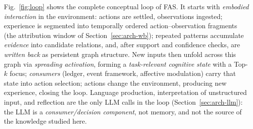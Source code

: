 \documentclass[10pt,a4paper]{article}
\begin{document}
Fig.~\ref{fig:loop} shows the complete conceptual loop of FAS. It starts with \emph{embodied interaction} in the environment: actions are settled, observations ingested; experience is segmented into temporally ordered action--observation fragments (the attribution window of Section~\ref{sec:arch-wb}); repeated patterns accumulate \emph{evidence} into candidate relations, and, after support and confidence checks, are \emph{written back} as persistent graph structure. New inputs then unfold across this graph via \emph{spreading activation}, forming a \emph{task-relevant cognitive state} with a Top-$k$ focus; \emph{consumers} (ledger, event framework, affective modulation) carry that state into action selection; actions change the environment, producing new experience, closing the loop. Language production, interpretation of unstructured input, and reflection are the only LLM calls in the loop (Section~\ref{sec:arch-llm}): the LLM is a \emph{consumer/decision component}, not memory, and not the source of the knowledge studied here.
\end{document}
